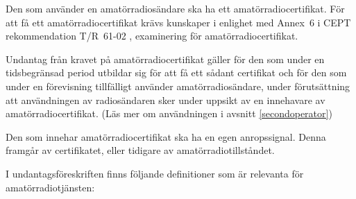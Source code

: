 Den som använder en amatörradiosändare ska ha ett amatörradiocertifikat.
För att få ett amatörradiocertifikat krävs kunskaper i enlighet med Annex~6 i
CEPT rekommendation T/R~61-02 \cite{TR6102}, examinering för
amatörradiocertifikat.

Undantag från kravet på amatörradiocertifikat gäller för den som under en
tidsbegränsad period utbildar sig för att få ett sådant certifikat och för
den som under en förevisning tillfälligt använder amatörradiosändare, under
förutsättning att användningen av radiosändaren sker under uppsikt av en
innehavare av amatörradiocertifikat.
(Läs mer om användningen i avsnitt \ref{secondoperator})

Den som innehar amatörradiocertifikat ska ha en egen anropssignal.
Denna framgår av certifikatet, eller tidigare av amatörradiotillståndet.

I undantagsföreskriften \cite{PTSFS2018:3} finns följande definitioner som är
relevanta för amatörradiotjänsten:

